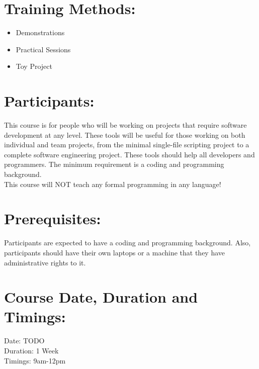 \documentclass[a4paper,11pt]{article}
\begin{document}
\section{Training Methods:}
\begin{itemize}
	\item Demonstrations
	\item Practical Sessions
	\item Toy Project
\end{itemize}

\section{Participants:}
This course is for people who will be working on projects that require software development at any level. These tools will be useful for those working on both individual and team projects, from the minimal single-{f}ile scripting project to a complete software engineering project. These tools should help all developers and programmers. The minimum requirement is a coding and programming background.\\
This course will NOT teach any formal programming in any language!

\section{Prerequisites:}
Participants are expected to have a coding and programming background. Also, participants should have their own laptops or a machine that they have administrative rights to it.

\section{Course Date, Duration and Timings:}
Date: TODO\\
Duration: 1 Week\\
Timings: 9am-12pm
\end{document}
